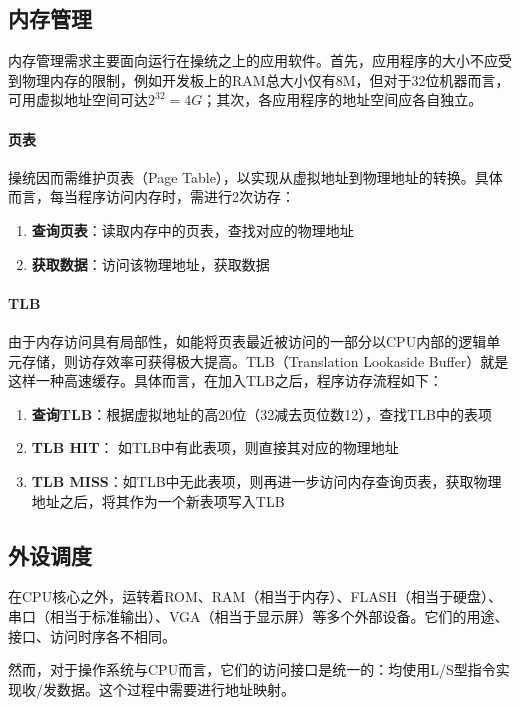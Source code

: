 \subsection{内存管理}

内存管理需求主要面向运行在操统之上的应用软件。首先，应用程序的大小不应受到物理内存的限制，例如开发板上的RAM总大小仅有8M，但对于32位机器而言，可用虚拟地址空间可达$2^{32} = 4G$；其次，各应用程序的地址空间应各自独立。

\paragraph{页表}
操统因而需维护页表（Page Table），以实现从虚拟地址到物理地址的转换。具体而言，每当程序访问内存时，需进行2次访存：
\begin{enumerate}
    \item {\bf 查询页表}：读取内存中的页表，查找对应的物理地址
    \item {\bf 获取数据}：访问该物理地址，获取数据
\end{enumerate}


\paragraph{TLB}
由于内存访问具有局部性，如能将页表最近被访问的一部分以CPU内部的逻辑单元存储，则访存效率可获得极大提高。TLB（Translation Lookaside Buffer）就是这样一种高速缓存。具体而言，在加入TLB之后，程序访存流程如下：

\begin{enumerate}
    \item {\bf 查询TLB}：根据虚拟地址的高20位（32减去页位数12），查找TLB中的表项
    \item {\bf TLB HIT}： 如TLB中有此表项，则直接其对应的物理地址
    \item {\bf TLB MISS}：如TLB中无此表项，则再进一步访问内存查询页表，获取物理地址之后，将其作为一个新表项写入TLB
\end{enumerate}

\subsection{外设调度}

在CPU核心之外，运转着ROM、RAM（相当于内存）、FLASH（相当于硬盘）、串口（相当于标准输出）、VGA（相当于显示屏）等多个外部设备。它们的用途、接口、访问时序各不相同。

然而，对于操作系统与CPU而言，它们的访问接口是统一的：均使用L/S型指令实现收/发数据。这个过程中需要进行地址映射。

